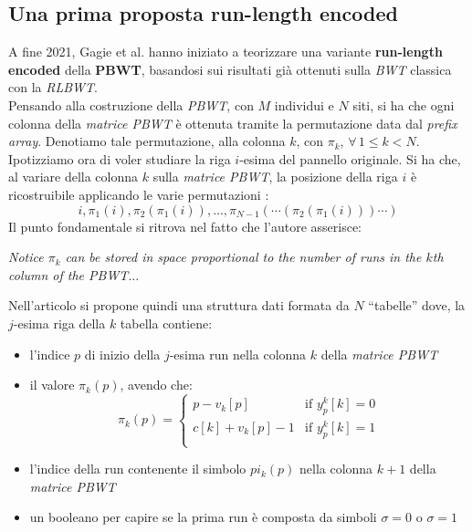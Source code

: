 \subsection{Una prima proposta run-length encoded}
\label{subsectravis}
A fine 2021, Gagie et al. \cite{tricks} hanno iniziato a teorizzare una variante
\textbf{run-length encoded} della \textbf{PBWT}, basandosi sui risultati
già ottenuti sulla \textit{BWT} classica con la \textit{RLBWT}.\\
Pensando alla costruzione della \textit{PBWT}, con $M$ individui e $N$ siti, si
ha che ogni colonna della 
\textit{matrice PBWT} è ottenuta tramite la permutazione data dal \textit{prefix
  array}. Denotiamo tale permutazione, alla colonna $k$, con $\pi_k$, $\forall\,
1\leq k<N$. 
Ipotizziamo ora di voler studiare la riga $i$-esima del pannello originale. Si
ha che, al variare della colonna $k$ sulla \textit{matrice PBWT}, la posizione
della riga $i$ è ricostruibile applicando le varie permutazioni
:
\begin{equation}
  \label{eq:pbwttrick}
  i, \pi_1(i), \pi_2(\pi_1(i)),\ldots,
  \pi_{N-1}(\cdots(\pi_2(\pi_1(i)))\cdots)
\end{equation}
Il punto fondamentale si ritrova nel fatto che l'autore asserisce:
\begin{center}
  \textit{Notice $\pi_k$ can be stored in space proportional to the number of
    runs in the $k$th column of the PBWT$\ldots$} 
\end{center}
Nell'articolo si propone quindi una struttura dati formata da $N$ ``tabelle''
dove, la $j$-esima riga della $k$ tabella contiene: 
\begin{itemize}
  \item l'indice $p$ di inizio della $j$-esima run nella colonna $k$ della
  \textit{matrice PBWT}
  \item il valore $\pi_k(p)$, avendo che:
  \begin{equation}
    \label{eq:pbwttrick1}
    \pi_k(p)=
    \begin{cases}
      p-v_k[p]&\mbox{if } y_p^k[k]=0\\
      c[k]+v_k[p]-1&\mbox{if } y_p^k[k]=1\\
    \end{cases}
  \end{equation}
  \item l'indice della run contenente il simbolo $pi_k(p)$ nella colonna $k+1$
  della \textit{matrice PBWT}
  \item un booleano per capire se la prima run è composta da simboli $\sigma=0$
  o $\sigma =1$
\end{itemize}
